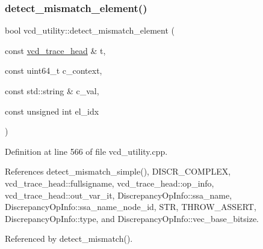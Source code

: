 \subsubsection{\texorpdfstring{detect\+\_\+mismatch\+\_\+element()}{detect\_mismatch\_element()}}
{\footnotesize\ttfamily bool vcd\+\_\+utility\+::detect\+\_\+mismatch\+\_\+element (\begin{DoxyParamCaption}\item[{const \hyperlink{structvcd__trace__head}{vcd\+\_\+trace\+\_\+head} \&}]{t,  }\item[{const uint64\+\_\+t}]{c\+\_\+context,  }\item[{const std\+::string \&}]{c\+\_\+val,  }\item[{const unsigned int}]{el\+\_\+idx }\end{DoxyParamCaption})\hspace{0.3cm}{\ttfamily [protected]}}



Definition at line 566 of file vcd\+\_\+utility.\+cpp.



References detect\+\_\+mismatch\+\_\+simple(), D\+I\+S\+C\+R\+\_\+\+C\+O\+M\+P\+L\+EX, vcd\+\_\+trace\+\_\+head\+::fullsigname, vcd\+\_\+trace\+\_\+head\+::op\+\_\+info, vcd\+\_\+trace\+\_\+head\+::out\+\_\+var\+\_\+it, Discrepancy\+Op\+Info\+::ssa\+\_\+name, Discrepancy\+Op\+Info\+::ssa\+\_\+name\+\_\+node\+\_\+id, S\+TR, T\+H\+R\+O\+W\+\_\+\+A\+S\+S\+E\+RT, Discrepancy\+Op\+Info\+::type, and Discrepancy\+Op\+Info\+::vec\+\_\+base\+\_\+bitsize.



Referenced by detect\+\_\+mismatch().

